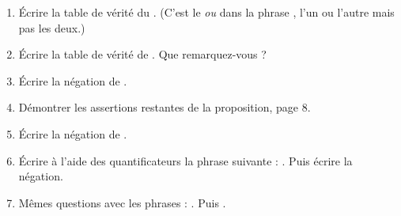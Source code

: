 \begin{frame}

\begin{miniexercice}
\begin{enumerate}
  \item \'Ecrire la table de vérité du . (C'est le \emph{ou} dans la phrase
, l'un ou l'autre mais pas les deux.) 
  \item \'Ecrire la table de vérité de . Que remarquez-vous ?
  \item \'Ecrire la négation de .
  \item Démontrer les assertions restantes de la proposition, page 8.
  \item \'Ecrire la négation de .
  \item \'Ecrire à l'aide des quantificateurs la phrase suivante :
. Puis écrire la négation.
  \item Mêmes questions avec les phrases : . Puis
.
\end{enumerate}  
\end{miniexercice}

\end{frame}

